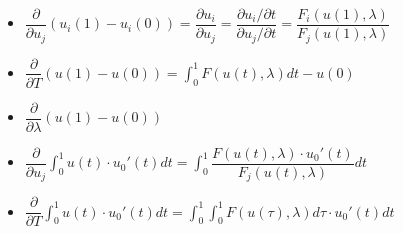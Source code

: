 \documentclass[10pt,a4paper]{article}
\begin{document}
\begin{itemize}

	\item $\dfrac{\partial}{\partial u_{j}}(u_{i}(1) - u_{i}(0)) = \dfrac{\partial u_{i}}{\partial u_{j}} = \dfrac{\partial u_{i} / \partial t}{\partial u_{j} / \partial t} = \dfrac{F_{i}(u(1),\lambda)}{F_{j}(u(1),\lambda)}$
	
	\item $\dfrac{\partial}{\partial T}(u(1) - u(0)) = \int_{0}^{1}F(u(t),\lambda)dt - u(0)$
	
	\item $\dfrac{\partial}{\partial \lambda}(u(1) - u(0))$
	
	\item $\dfrac{\partial}{\partial u_{j}}\int_{0}^{1}u(t)\cdot u_{0}'(t)dt = \int_{0}^{1}\dfrac{F(u(t),\lambda) \cdot u_{0}'(t) }{F_{j}(u(t),\lambda)} dt$
	
	\item $\dfrac{\partial}{\partial T}\int_{0}^{1}u(t)\cdot u_{0}'(t)dt = \int_{0}^{1}\int_{0}^{1}F(u(\tau),\lambda)d\tau\cdot u_{0}'(t)dt$
	
	

\end{itemize}
\end{document}
